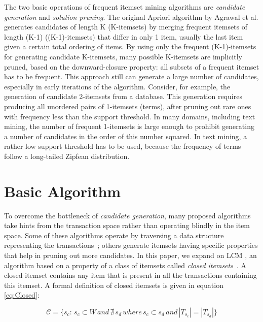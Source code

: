 \documentclass{sig-alternate}
\begin{document}
The two basic operations of frequent itemset mining algorithms are
\emph{candidate generation} and \emph{solution pruning}.
The original Apriori algorithm by Agrawal et al. \cite{agrawal1994fast}
generates candidates of length K (K-itemsets) by merging frequent itemsets of
length (K-1) ((K-1)-itemsets) that differ in only 1 item, usually the last
item given a certain total ordering of items.
By using only the frequent  (K-1)-itemsets for generating candidate K-itemsets,
many possible K-itemsets are implicitly pruned, based on the downward-closure property:
all subsets of a frequent itemset has to be frequent.
This approach still can generate a large number of candidates, especially
in early iterations of the algorithm.
Consider, for example, the generation of candidate 2-itemsets from a database.
This generation requires producing all unordered pairs of 1-itemsets (terms),
after pruning out rare ones with frequency less than the support threshold.
In many domains, including text mining, the number of frequent 1-itemsets is
large enough to prohibit generating a number of candidates in the order of this
number squared.
In text mining, a rather low support threshold has to be used, because the
frequency of terms follow a long-tailed Zipfean distribution.

\section{Basic Algorithm}
\label{sec:lcm}
To overcome the bottleneck of \emph{candidate generation}, many proposed
algorithms take hints from the transaction space rather than operating blindly
in the item space.
Some of these algorithms operate by traversing a data structure representing
the transactions~\cite{han2000mining}; others generate itemsets having
specific properties that help in pruning out more candidates.
In this paper, we expand on LCM \cite{uno2004lcm}, an algorithm based on a
property of a class of itemsets called
\emph{closed itemsets}~\cite{pasquier1999discovering}.
A closed itemset contains any item that is present in all the transactions
containing this itemset.
A formal definition of closed itemsets is given in equation \ref{eq:Closed}: 

\begin{equation}\label{eq:Closed}\mathcal{C} = \{s_c:\, s_c \subset W \, and \,\nexists \, s_d \, where \, s_c  \subset s_d \, and \, |T_{s_c}| = |T_{s_d}|\}\end{equation}
\end{document}
